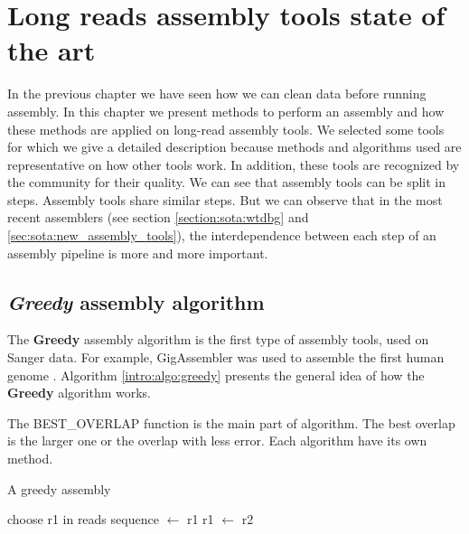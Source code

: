 \documentclass[main]{subfiles}
\begin{document}
\chapter{Long reads assembly tools state of the art}\label{chapter:sota}

In the previous chapter we have seen how we can clean data before running assembly. In this chapter we present methods to perform an assembly and how these methods are applied on long-read assembly tools. We selected some tools for which we give a detailed description because methods and algorithms used are representative on how other tools work. In addition, these tools are recognized by the community for their quality.
We can see that assembly tools can be split in steps. Assembly tools share similar steps. But we can observe that in the most recent assemblers (see section \ref{section:sota:wtdbg} and \ref{sec:sota:new_assembly_tools}), the interdependence between each step of an assembly pipeline is more and more important.

\section{\textit{Greedy} assembly algorithm}

The \textbf{Greedy} assembly algorithm is the first type of assembly tools, used on Sanger data. For example, GigAssembler was used to assemble the first human genome \cite{GigAssembler}. Algorithm \ref{intro:algo:greedy} presents the general idea of how the \textbf{Greedy} algorithm works.

The BEST\_OVERLAP function is the main part of algorithm. The best overlap is the larger one or the overlap with less error. Each algorithm have its own method.

\begin{algorithm}[ht]
    \caption{A greedy assembly}
    \begin{algorithmic}[1]
        \State choose r1 in reads
        \State sequence $\leftarrow$ r1
            \State {}
            \State {}
            \State r1 $\leftarrow$ r2
        \EndWhile
    \EndFunction
    \end{algorithmic}
    \label{intro:algo:greedy}
\end{algorithm}
\end{document}
